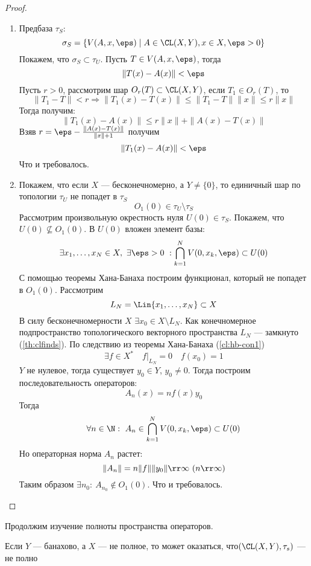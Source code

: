 \begin{proof}
	\hfill
	\begin{enumerate}
		\item Предбаза $\tau_S$:
		$$
		\sigma_S = \{V(A,x, \eps)\mid A \in \CL(X,Y), x\in X, \eps >0\}
		$$
		Покажем, что $\sigma_S \subset \tau_U$. Пусть $T \in V(A, x, \eps)$, тогда
		$$
		\|T(x) - A(x)\| < \eps
		$$ 
		Пусть $r > 0$, рассмотрим шар $O_r(T) \subset \CL(X,Y)$, если $T_1 \in O_r(T)$, то 
		$$
		\|T_1 - T\| < r \Rightarrow \|T_1(x) - T(x)\| \leq \|T_1 - T\| \|x\| \leq r \|x\|
		$$
		Тогда получим:
		$$
		\|T_1(x) - A(x)\| \leq r\|x\| + \|A(x) - T(x)\| 
		$$
		Взяв $r =  \eps - \frac{\|A(x) - T(x)\|}{\|x\| + 1}$ получим
		$$
		\|T_1(x) - A(x)\| < \eps 
		$$
		Что и требовалось.
		\item Покажем, что если $X$ --- бесконечномерно, а $Y \neq \{0\}$, то единичный шар по топологии $\tau_U$ не попадет в $\tau_S$
		$$
		O_1(0) \in \tau_U\setminus \tau_S
		$$
		Рассмотрим произвольную окрестность нуля $U(0) \in \tau_S$. Покажем, что $U(0) \nsubseteq O_1(0)$. В $U(0)$ вложен элемент базы:
		$$
		\exists x_1, \dots, x_N \in X, \ \exists\eps > 0 \ : \bigcap_{k=1}^N V(0, x_k, \eps) \subset U(0)
		$$
		С помощью теоремы Хана-Банаха построим функционал, который не попадет в $O_1(0)$. Рассмотрим
		$$
		L_N = \Lin \{x_1, \dots, x_N\} \subset X
		$$
		В силу бесконечномерности $X$ $\exists x_0 \in X \setminus L_N$. Как конечномерное подпространство топологического векторного пространства $L_N$ --- замкнуто (\ref{th:clfinds}). По следствию из теоремы Хана-Банаха (\ref{cl:hb-con1}) 
		$$
		\exists f \in X^* \quad f|_{L_N} = 0 \quad f(x_0) = 1
		$$
		$Y$ не нулевое, тогда существует $y_0 \in Y$, $y_0 \neq 0$. Тогда построим последовательность операторов:
		$$
		A_n(x) = nf(x)y_0
		$$
		Тогда 
		$$
		\forall n \in \N: \ A_n \in \bigcap_{k=1}^N V(0, x_k, \eps) \subset U(0)
		$$
		Но операторная норма $A_n$ растет:
		$$
		\|A_n\| = n\|f\|\|y_0\| \rr \infty \ (n \rr \infty)
		$$
		Таким образом $\exists n_0: \ A_{n_0} \notin O_1(0)$. Что и требовалось.
	\end{enumerate}
\end{proof}
Продолжим изучение полноты пространства операторов.
\begin{example}
	Если $Y$ --- банахово, а $X$ --- не полное, то  может оказаться, что$(\CL(X,Y), \tau_s)$ --- не полно
\end{example}
